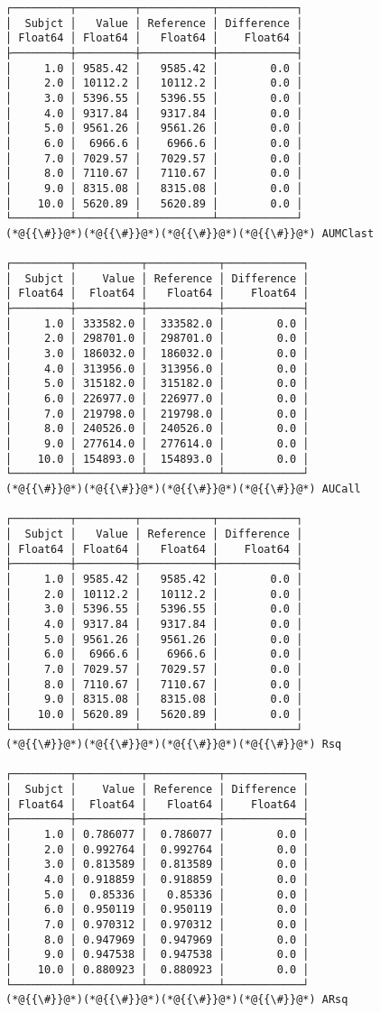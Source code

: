 \documentclass[12pt,a4paper]{article}
\begin{document}
\begin{lstlisting}
┌─────────┬─────────┬───────────┬────────────┐
│  Subjct │   Value │ Reference │ Difference │
│ Float64 │ Float64 │   Float64 │    Float64 │
├─────────┼─────────┼───────────┼────────────┤
│     1.0 │ 9585.42 │   9585.42 │        0.0 │
│     2.0 │ 10112.2 │   10112.2 │        0.0 │
│     3.0 │ 5396.55 │   5396.55 │        0.0 │
│     4.0 │ 9317.84 │   9317.84 │        0.0 │
│     5.0 │ 9561.26 │   9561.26 │        0.0 │
│     6.0 │  6966.6 │    6966.6 │        0.0 │
│     7.0 │ 7029.57 │   7029.57 │        0.0 │
│     8.0 │ 7110.67 │   7110.67 │        0.0 │
│     9.0 │ 8315.08 │   8315.08 │        0.0 │
│    10.0 │ 5620.89 │   5620.89 │        0.0 │
└─────────┴─────────┴───────────┴────────────┘
(*@{{\#}}@*)(*@{{\#}}@*)(*@{{\#}}@*)(*@{{\#}}@*) AUMClast

┌─────────┬──────────┬───────────┬────────────┐
│  Subjct │    Value │ Reference │ Difference │
│ Float64 │  Float64 │   Float64 │    Float64 │
├─────────┼──────────┼───────────┼────────────┤
│     1.0 │ 333582.0 │  333582.0 │        0.0 │
│     2.0 │ 298701.0 │  298701.0 │        0.0 │
│     3.0 │ 186032.0 │  186032.0 │        0.0 │
│     4.0 │ 313956.0 │  313956.0 │        0.0 │
│     5.0 │ 315182.0 │  315182.0 │        0.0 │
│     6.0 │ 226977.0 │  226977.0 │        0.0 │
│     7.0 │ 219798.0 │  219798.0 │        0.0 │
│     8.0 │ 240526.0 │  240526.0 │        0.0 │
│     9.0 │ 277614.0 │  277614.0 │        0.0 │
│    10.0 │ 154893.0 │  154893.0 │        0.0 │
└─────────┴──────────┴───────────┴────────────┘
(*@{{\#}}@*)(*@{{\#}}@*)(*@{{\#}}@*)(*@{{\#}}@*) AUCall

┌─────────┬─────────┬───────────┬────────────┐
│  Subjct │   Value │ Reference │ Difference │
│ Float64 │ Float64 │   Float64 │    Float64 │
├─────────┼─────────┼───────────┼────────────┤
│     1.0 │ 9585.42 │   9585.42 │        0.0 │
│     2.0 │ 10112.2 │   10112.2 │        0.0 │
│     3.0 │ 5396.55 │   5396.55 │        0.0 │
│     4.0 │ 9317.84 │   9317.84 │        0.0 │
│     5.0 │ 9561.26 │   9561.26 │        0.0 │
│     6.0 │  6966.6 │    6966.6 │        0.0 │
│     7.0 │ 7029.57 │   7029.57 │        0.0 │
│     8.0 │ 7110.67 │   7110.67 │        0.0 │
│     9.0 │ 8315.08 │   8315.08 │        0.0 │
│    10.0 │ 5620.89 │   5620.89 │        0.0 │
└─────────┴─────────┴───────────┴────────────┘
(*@{{\#}}@*)(*@{{\#}}@*)(*@{{\#}}@*)(*@{{\#}}@*) Rsq

┌─────────┬──────────┬───────────┬────────────┐
│  Subjct │    Value │ Reference │ Difference │
│ Float64 │  Float64 │   Float64 │    Float64 │
├─────────┼──────────┼───────────┼────────────┤
│     1.0 │ 0.786077 │  0.786077 │        0.0 │
│     2.0 │ 0.992764 │  0.992764 │        0.0 │
│     3.0 │ 0.813589 │  0.813589 │        0.0 │
│     4.0 │ 0.918859 │  0.918859 │        0.0 │
│     5.0 │  0.85336 │   0.85336 │        0.0 │
│     6.0 │ 0.950119 │  0.950119 │        0.0 │
│     7.0 │ 0.970312 │  0.970312 │        0.0 │
│     8.0 │ 0.947969 │  0.947969 │        0.0 │
│     9.0 │ 0.947538 │  0.947538 │        0.0 │
│    10.0 │ 0.880923 │  0.880923 │        0.0 │
└─────────┴──────────┴───────────┴────────────┘
(*@{{\#}}@*)(*@{{\#}}@*)(*@{{\#}}@*)(*@{{\#}}@*) ARsq


\end{lstlisting}
\end{document}
